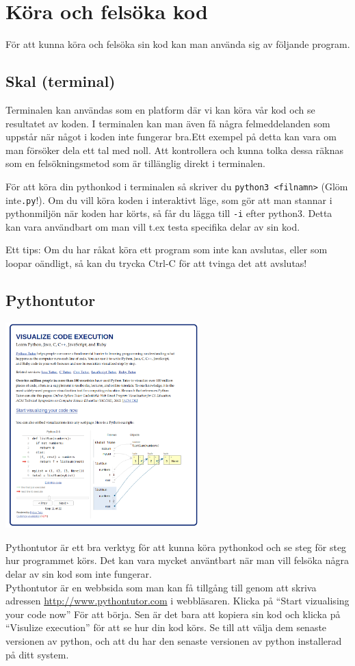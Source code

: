 \documentclass{TDP003mall}
\begin{document}
\section{Köra och felsöka kod}
För att kunna köra och felsöka sin kod kan man använda sig av följande program.

\subsection*{Skal (terminal)}
Terminalen kan användas som en platform där vi kan köra vår kod och se resultatet av koden. I terminalen kan man även få några felmeddelanden som uppstår när något i koden inte fungerar bra.Ett exempel på detta kan vara om man försöker dela ett tal med noll. Att kontrollera och kunna tolka dessa räknas som en felsökningsmetod som är tillänglig direkt i terminalen.

För att köra din pythonkod i terminalen så skriver du \texttt{python3 <filnamn>} (Glöm inte\texttt{.py}!). Om du vill köra koden i interaktivt läge, som gör att man stannar i pythonmiljön när koden har körts, så får du lägga till \texttt{-i} efter python3. Detta kan vara användbart om man vill t.ex testa specifika delar av sin kod.

Ett tips: Om du har råkat köra ett program som inte kan avslutas, eller som loopar oändligt, så kan du trycka Ctrl-C för att tvinga det att avslutas! 

\subsection*{Pythontutor}
\includegraphics[width=75mm]{pythontutor}

Pythontutor är ett bra verktyg för att kunna köra pythonkod och se steg för steg hur programmet körs. Det kan vara mycket använtbart när man vill felsöka några delar av sin kod som inte fungerar.\\
Pythontutor är en webbsida som man kan få tillgång till genom att skriva adressen \href{http://www.pythontutor.com}{http://www.pythontutor.com} i webbläsaren. Klicka på ``Start vizualising your code now'' För att börja. Sen är det bara att kopiera sin kod och klicka på ``Visulize execution'' för att se hur din kod körs. Se till att välja dem senaste versionen av python, och att du har den senaste versionen av python installerad på ditt system.
\end{document}
